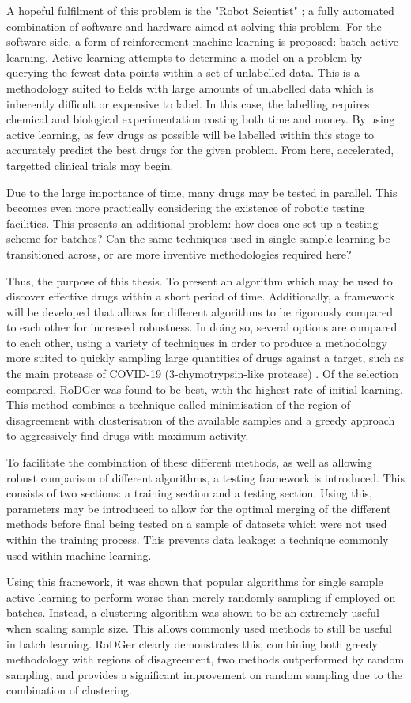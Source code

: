 A hopeful fulfilment of this problem is the "Robot Scientist" \cite{And10}; a fully automated combination of software and hardware aimed at solving this problem. For the software side, a form of reinforcement machine learning is proposed: batch active learning. Active learning attempts to determine a model on a problem by querying the fewest data points within a set of unlabelled data. This is a methodology suited to fields with large amounts of unlabelled data which is inherently difficult or expensive to label. In this case, the labelling requires chemical and biological experimentation costing both time and money. By using active learning, as few drugs as possible will be labelled within this stage to accurately predict the best drugs for the given problem. From here, accelerated, targetted clinical trials may begin.

Due to the large importance of time, many drugs may be tested in parallel. This becomes even more practically considering the existence of robotic testing facilities. This presents an additional problem: how does one set up a testing scheme for batches? Can the same techniques used in single sample learning be transitioned across, or are more inventive methodologies required here?

Thus, the purpose of this thesis. To present an algorithm which may be used to discover effective drugs within a short period of time. Additionally, a framework will be developed that allows for different algorithms to be rigorously compared to each other for increased robustness. In doing so, several options are compared to each other, using a variety of techniques in order to produce a methodology more suited to quickly sampling large quantities of drugs against a target, such as the main protease of \mbox{COVID-19} (3-chymotrypsin-like protease) \cite{prot20}. Of the selection compared, RoDGer was found to be best, with the highest rate of initial learning. This method combines a technique called minimisation of the region of disagreement with clusterisation of the available samples and a greedy approach to aggressively find drugs with maximum activity.

To facilitate the combination of these different methods, as well as allowing robust comparison of different algorithms, a testing framework is introduced. This consists of two sections: a training section and a testing section. Using this, parameters may be introduced to allow for the optimal merging of the different methods before final being tested on a sample of datasets which were not used within the training process. This prevents data leakage: a technique commonly used within machine learning.

Using this framework, it was shown that popular algorithms for single sample active learning to perform worse than merely randomly sampling if employed on batches. Instead, a clustering algorithm was shown to be an extremely useful when scaling sample size. This allows commonly used methods to still be useful in batch learning. RoDGer clearly demonstrates this, combining both greedy methodology with regions of disagreement, two methods outperformed by random sampling, and provides a significant improvement on random sampling due to the combination of clustering.
